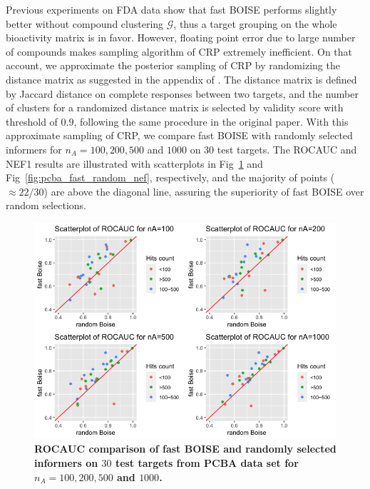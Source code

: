 \documentclass[11pt,a4paper]{article}
\theoremstyle{plain}
\begin{document}
Previous experiments on FDA data show that fast BOISE performs slightly better without compound clustering $\mathcal G$, thus a target grouping on the whole bioactivity matrix is in favor. However, floating point error due to large number of compounds makes sampling algorithm of CRP extremely inefficient. On that account, we approximate the posterior sampling of CRP by randomizing the distance matrix as suggested in the appendix of \cite{Ma_approximate_CRP_2021}. The distance matrix is defined by Jaccard distance on complete responses between two targets, and the number of clusters for a randomized distance matrix is selected by validity score with threshold of $0.9$, following the same procedure in the original paper. With this approximate sampling of CRP, we compare fast BOISE with randomly selected informers for $n_A = 100,200,500$ and $1000$ on 30 test targets. The ROCAUC and NEF1 results are illustrated with scatterplots in Fig~\ref{fig:pcba_fast_random_roc} and Fig~\ref{fig:pcba_fast_random_nef}, respectively, and the majority of points ($\approx 22/30$) are above the diagonal line, assuring the superiority of fast BOISE over random selections.
\begin{figure}[!ht]
\centering
\includegraphics[width=5.0in]{Figs/random_entropy_roc_compar.png}
\caption{\label{fig:pcba_fast_random_roc} 
{\bf ROCAUC comparison of fast BOISE and randomly selected informers on $30$ test targets from PCBA data set for $n_A = 100, 200, 500$ and $1000$. }}
\end{figure}
\end{document}
